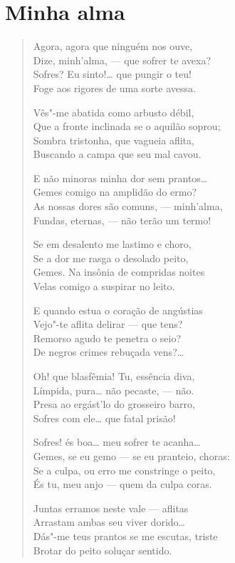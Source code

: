 \chapter{Minha alma}

\begin{verse}
Agora, agora que ninguém nos ouve,\\
Dize, minh'alma, --- que sofrer te avexa?\\
Sofres? Eu sinto!\ldots{} que pungir o teu!\\
Foge aos rigores de uma sorte avessa.

Vês"-me abatida como arbusto débil,\\
Que a fronte inclinada se o aquilão soprou;\\
Sombra tristonha, que vagueia aflita,\\
Buscando a campa que seu mal cavou.

E não minoras minha dor sem prantos\ldots{}\\
Gemes comigo na amplidão do ermo?\\
As nossas dores são comuns, --- minh'alma,\\
Fundas, eternas, --- não terão um termo!

Se em desalento me lastimo e choro,\\
Se a dor me rasga o desolado peito,\\
Gemes. Na insônia de compridas noites\\
Velas comigo a suspirar no leito.

E quando estua o coração de angústias\\
Vejo"-te aflita delirar --- que tens?\\
Remorso agudo te penetra o seio?\\
De negros crimes rebuçada vens?\ldots{}

Oh! que blasfêmia! Tu, essência diva,\\
Límpida, pura\ldots{} não pecaste, --- não.\\
Presa ao ergást'lo do grosseiro barro,\\
Sofres com ele\ldots{} que fatal prisão!

Sofres! és boa\ldots{} meu sofrer te acanha\ldots{}\\
Gemes, se eu gemo --- se eu pranteio, choras:\\
Se a culpa, ou erro me constringe o peito,\\
És tu, meu anjo --- quem da culpa coras.

Juntas erramos neste vale --- aflitas\\
Arrastam ambas seu viver dorido\ldots{}\\
Dás"-me teus prantos se me escutas, triste\\
Brotar do peito soluçar sentido.


\end{verse}
